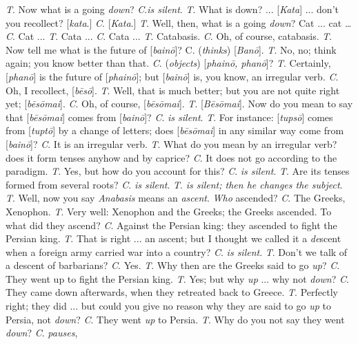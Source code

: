 \emph{T}. Now what is a going \emph{down}? \emph{C}.\emph{is silent}.
\emph{T}. What is down? ... [\emph{Kata}] ... don't you recollect? [\emph{kata}.]
\emph{C}. [\emph{Kata}.]
\emph{T}. Well, then, what is a going \emph{down}? Cat ... cat … \emph{C}.
Cat ...
\emph{T}. Cata ... \emph{C}. Cata ...
\emph{T}. Catabasis. \emph{C}. Oh, of course, catabasis.
\emph{T}. Now tell me what is the future of [\emph{bain\={o}}]?
C. (\emph{thinks}) [\emph{Ban\={o}}].
\emph{T}. No, no; think again; you know better than that. \emph{C}. (\emph{objects})
[\emph{phain\={o}, phan\={o}}]?
\emph{T}. Certainly, [\emph{phan\={o}}]
is the future of [\emph{phain\={o}}];
but [\emph{bain\={o}}] is, you
know, an irregular verb. \emph{C}. Oh, I recollect, [\emph{b\={e}s\={o}}].
\emph{T}. Well, that is much better; but you are not quite right yet;
[\emph{b\={e}s\={o}mai}]. \emph{C}.
Oh, of course, [\emph{b\={e}s\={o}mai}].
\emph{T}. [\emph{B\={e}s\={o}mai}].
Now do you mean to say that [\emph{b\={e}s\={o}mai}]
comes from [\emph{bain\={o}}]? \emph{C}.
\emph{is silent}.
\emph{T}. For instance: [\emph{tups\={o}}]
comes from [\emph{tupt\={o}}] by
a change of letters; does [\emph{b\={e}s\={o}mai}]
in any similar way come from [\emph{bain\={o}}]?
\emph{C}. It is an irregular verb.
\emph{T}. What do you mean by an irregular verb? does it form tenses
anyhow and by caprice? \emph{C}. It does not go according to the
paradigm.
\emph{T}. Yes, but how do you account for this? \emph{C}. \emph{is silent}.
\emph{T}. Are its tenses formed from several roots? \emph{C}. \emph{is
silent}. \emph{T}. \emph{is silent; then he changes the subject}.
\emph{T}. Well, now you say \emph{Anabasis} means an \emph{ascent}. \emph{Who}
ascended? \emph{C}. The Greeks, Xenophon.
\emph{T}. Very well: Xenophon and the Greeks; the Greeks ascended. To
what did they ascend? \emph{C}. Against the Persian king: they
ascended to fight the Persian king.
\emph{T}. That is right ... an ascent; but I thought we called it a \emph{de}scent
when a foreign army carried war into a country? \emph{C}. \emph{is silent}.
\emph{T}. Don't we talk of a descent of barbarians? \emph{C}. Yes.
\emph{T}. Why then are the Greeks said to go \emph{up}? \emph{C}. They
went up to fight the Persian king.
\emph{T}. Yes; but why \emph{up} ... why not \emph{down}? \emph{C}.
They came down afterwards, when they retreated back to Greece.
\emph{T}. Perfectly right; they did ... but could you give no reason
why they are said to go \emph{up} to Persia, not \emph{down}? \emph{C}.
They went \emph{up} to Persia. \emph{T}. Why do you not say they went \emph{down}? \emph{C}. \emph{pauses},
